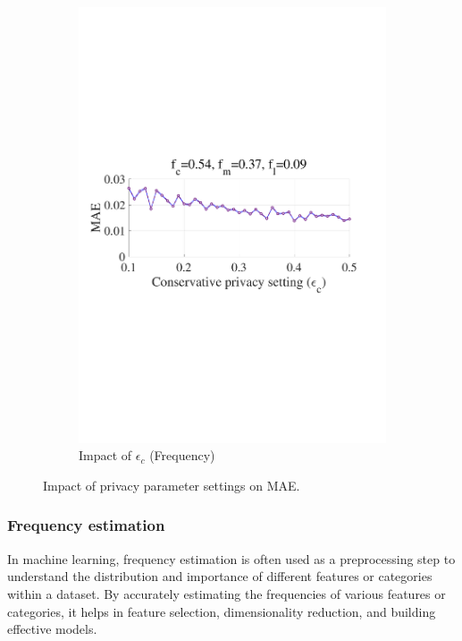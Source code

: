 \documentclass[letterpaper]{article} %
\begin{document}
\begin{figure}[htbp]
\begin{subfigure}[b]{0.23\textwidth}
    \includegraphics[width=\textwidth]{picture/MAEvsEpsilon_c_freq.pdf}
    \caption{Impact of $\epsilon_c$ (Frequency)}
    \label{fig:sub4}
  \end{subfigure}
  \caption{Impact of privacy parameter settings on MAE.}
  \label{fig:full}
\end{figure}
\subsubsection{Frequency estimation}
In machine learning, frequency estimation is often used as a preprocessing step to understand the distribution and importance of different features or categories within a dataset. By accurately estimating the frequencies of various features or categories, it helps in feature selection, dimensionality reduction, and building effective models. 
\end{document}
